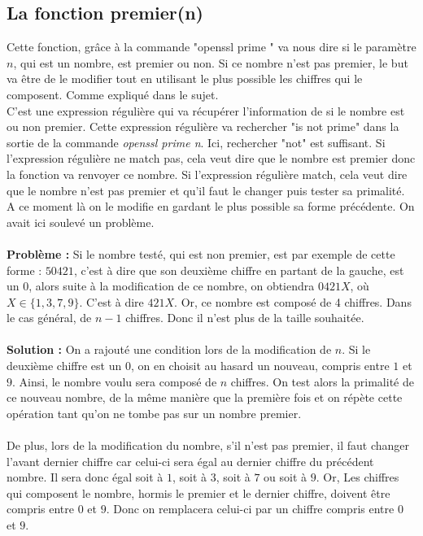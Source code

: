 \documentclass[12pt]{article}
\theoremstyle{definition}
\begin{document}
	\subsection{La fonction premier(n)}
	Cette fonction, grâce à la commande "openssl prime " va nous dire si le paramètre $n$, qui est un nombre, est premier ou non. Si ce nombre n'est pas premier, le but va être de le modifier tout en utilisant le plus possible les chiffres qui le composent. Comme expliqué dans le sujet. \\
C'est une expression régulière qui va récupérer l'information de si le nombre est ou non premier. Cette expression régulière va rechercher "is not prime" dans la sortie de la commande \textit{openssl prime n}. Ici, rechercher "not" est suffisant. Si l'expression régulière ne match pas, cela veut dire que le nombre est premier donc la fonction va renvoyer ce nombre. Si l'expression régulière match, cela veut dire que le nombre n'est pas premier et qu'il faut le changer puis tester sa primalité.\\
A ce moment là on le modifie en gardant le plus possible sa forme précédente. On avait ici soulevé un problème.\\\\
\textbf{Problème : }Si le nombre testé, qui est non premier, est par exemple de cette forme : $50421$, c'est à dire que son deuxième chiffre en partant de la gauche, est un $0$, alors suite à la modification de ce nombre, on obtiendra $0421X$, où $X \in \lbrace 1,3,7,9 \rbrace$. C'est à dire $421X$. Or, ce nombre est composé de 4 chiffres. Dans le cas général, de $n-1$ chiffres. Donc il n'est plus de la taille souhaitée. \\\\
\textbf{Solution : }On a rajouté une condition lors de la modification de $n$. Si le deuxième chiffre est un $0$, on en choisit au hasard un nouveau, compris entre $1$ et $9$. Ainsi, le nombre voulu sera composé de $n$ chiffres. On test alors la primalité de ce nouveau nombre, de la même manière que la première fois et on répète cette opération tant qu'on ne tombe pas sur un nombre premier.\\\\
De plus, lors de la modification du nombre, s'il n'est pas premier, il faut changer l'avant dernier chiffre car celui-ci sera égal au dernier chiffre du précédent nombre. Il sera donc égal soit à $1$, soit à $3$, soit à $7$ ou soit à $9$. Or, Les chiffres qui composent le nombre, hormis le premier et le dernier chiffre, doivent être compris entre $0$ et $9$. Donc on remplacera celui-ci par un chiffre compris entre $0$ et $9$.
\end{document}
